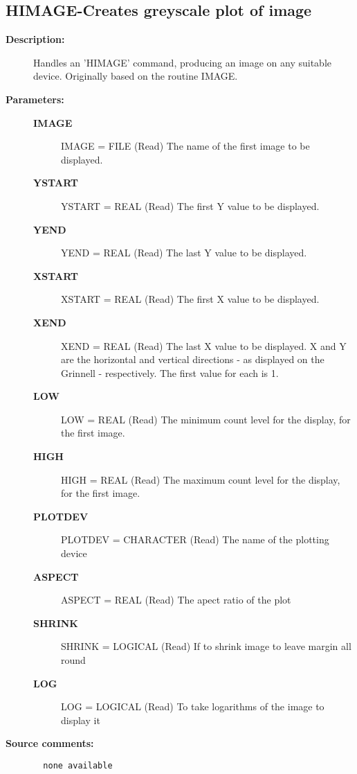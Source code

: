 \subsection{HIMAGE-\label{HIMAGE}Creates greyscale plot of image}
\begin{description}

\item [{\bf Description:}]
     Handles an 'HIMAGE' command, producing an image on any suitable
     device. Originally based on the routine IMAGE.

\item [{\bf Parameters:}]
\begin{description}
\item [{\bf IMAGE}]
     IMAGE = FILE (Read)
        The name of the first image to be displayed.
\item [{\bf YSTART}]
     YSTART = REAL (Read)
        The first Y value to be displayed.
\item [{\bf YEND}]
     YEND = REAL (Read)
        The last Y value to be displayed.
\item [{\bf XSTART}]
     XSTART = REAL (Read)
        The first X value to be displayed.
\item [{\bf XEND}]
     XEND = REAL (Read)
        The last X value to be displayed.
             X and Y are the horizontal and vertical directions
             - as displayed on the Grinnell - respectively.  The
             first value for each is 1.
\item [{\bf LOW}]
     LOW = REAL (Read)
        The minimum count level for the display, for
             the first image.
\item [{\bf HIGH}]
     HIGH = REAL (Read)
        The maximum count level for the display, for
             the first image.
\item [{\bf PLOTDEV}]
     PLOTDEV = CHARACTER (Read)
        The name of the plotting device
\item [{\bf ASPECT}]
     ASPECT = REAL (Read)
        The apect ratio of the plot
\item [{\bf SHRINK}]
     SHRINK = LOGICAL (Read)
        If to shrink image to leave margin all round
\item [{\bf LOG}]
     LOG = LOGICAL (Read)
        To take logarithms of the image to display it
\end{description}

\item [{\bf Source comments:}]
\begin{verbatim}
  none available

\end{verbatim}
\end{description}
